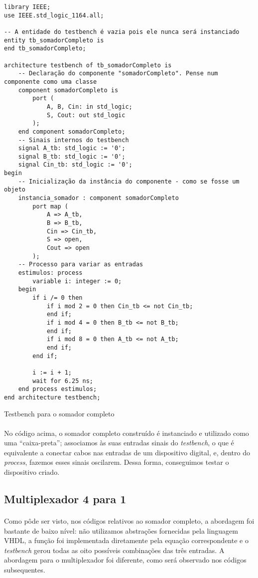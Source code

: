 \documentclass[a4paper,12pt]{article}
\newenvironment{code}{\captionsetup{type=listing}}{}
\begin{document}
\begin{code}
\begin{verbatim}
library IEEE;
use IEEE.std_logic_1164.all;

-- A entidade do testbench é vazia pois ele nunca será instanciado
entity tb_somadorCompleto is
end tb_somadorCompleto;

architecture testbench of tb_somadorCompleto is
    -- Declaração do componente "somadorCompleto". Pense num componente como uma classe
    component somadorCompleto is
        port (
            A, B, Cin: in std_logic;
            S, Cout: out std_logic
        );
    end component somadorCompleto;
    -- Sinais internos do testbench
    signal A_tb: std_logic := '0';
    signal B_tb: std_logic := '0';
    signal Cin_tb: std_logic := '0';
begin
    -- Inicialização da instância do componente - como se fosse um objeto
    instancia_somador : component somadorCompleto 
        port map (
            A => A_tb,
            B => B_tb,
            Cin => Cin_tb,
            S => open,
            Cout => open
        );
    -- Processo para variar as entradas
    estimulos: process
        variable i: integer := 0;
    begin
        if i /= 0 then
            if i mod 2 = 0 then Cin_tb <= not Cin_tb;
            end if;
            if i mod 4 = 0 then B_tb <= not B_tb;
            end if;
            if i mod 8 = 0 then A_tb <= not A_tb;
            end if;
        end if;

        i := i + 1;
        wait for 6.25 ns;
    end process estimulos;
end architecture testbench;
\end{verbatim}
\caption{Testbench para o somador completo}
\end{code}

\paragraph{}
No código acima, o somador completo construído é instanciado e utilizado como uma ``caixa-preta''; associamos às suas entradas sinais do \textit{testbench}, o que é equivalente a conectar cabos nas entradas de um dispositivo digital, e, dentro do \textit{process}, fazemos esses sinais oscilarem. Dessa forma, conseguimos testar o dispositivo criado.

\subsection{Multiplexador 4 para 1}
\paragraph{}
Como pôde ser visto, nos códigos relativos ao somador completo, a abordagem foi bastante de baixo nível: não utilizamos abstrações fornecidas pela linguagem VHDL, a função foi implementada diretamente pela equação correspondente e o \textit{testbench} gerou todas as oito possíveis combinações das três entradas. A abordagem para o multiplexador foi diferente, como será observado nos códigos subsequentes.
\end{document}
